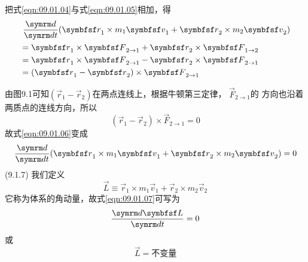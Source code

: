 把式\eqref{eqn:09.01.04}与式\eqref{eqn:09.01.05}相加，得
\begin{equation}\label{eqn:09.01.06}
  \begin{aligned}
     & ~\frac { \dif } { \dif t } ( \vec{r} _ { 1 } \times m _ { 1 } \vec{v} _ { 1 } + \vec{r} _ { 2 } \times m _ { 2 } \vec{v} _ { 2 } ) \\
     & = \vec{r} _ { 1 } \times \vec{F} _ { 2 \to 1 } + \vec{r}_ { 2 } \times \vec{F} _ { 1 \to 2 }                                       \\
     & = \vec{r} _ { 1 } \times \vec{F} _ { 2 \to 1 } - \vec{r}_ { 2 } \times \vec{F} _ { 2 \to 1 }                                       \\
     & = ( \vec{r} _ { 1 } - \vec{r} _ { 2 } ) \times \vec{F} _ { 2 \to 1 }
  \end{aligned}
\end{equation}

由图9.1可知$( \vec{r} _ { 1 } - \vec{r} _ { 2 } )$在两点连线上，根据牛顿第三定律， $\vec{F} _ { 2 \to 1 }$的
方向也沿着两质点的连线方向，所以
\begin{equation*}
  ( \vec{r} _ { 1 } - \vec{r} _ { 2 } ) \times \vec{F} _ { 2 \to 1 } = 0
\end{equation*}
故式\eqref{eqn:09.01.06}变成
\begin{equation}\label{eqn:09.01.07}
  \frac { \dif } { \dif t } ( \vec{r} _ { 1 } \times m _ { 1 } \vec{v} _ { 1 } + \vec{r} _ { 2 } \times m _ { 2 } \vec{v} _ { 2 } ) = 0
\end{equation}(9.1.7)
我们定义
\begin{equation}\label{eqn:09.01.08}
  \vec{L} \equiv \vec{r} _ { 1 } \times m _ { 1 } \vec{v} _ { 1 } + \vec{r} _ { 2 } \times m _ { 2 } \vec{v} _ { 2 }
\end{equation}
它称为体系的角动量，故式\eqref{eqn:09.01.07}可写为
\begin{equation*}
  \frac { \dif \vec{L} } { \dif t } = 0
\end{equation*}
或
\begin{equation}\label{eqn:09.01.09}
  \vec{L}=\text{不变量}
\end{equation}

